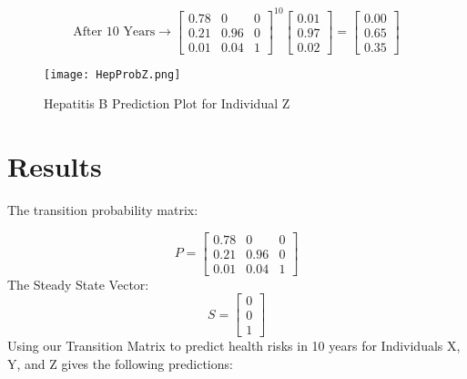 \documentclass{article}
\begin{document}
\begin{equation*}
\text{After 10 Years}
\longrightarrow
   \begin{bmatrix}
    0.78 & 0 & 0 \\
    0.21 & 0.96 & 0 \\
    0.01 & 0.04 & 1
    \end{bmatrix} ^{10}
    \begin{bmatrix}
        0.01 \\
        0.97 \\
        0.02
   \end{bmatrix}
   =
   \begin{bmatrix}
        0.00 \\
        0.65 \\
        0.35
   \end{bmatrix}
\end{equation*}

\begin{figure}[htp]
    \centering
    \texttt{[image: HepProbZ.png]}
    \caption{Hepatitis B Prediction Plot for Individual Z}
\end{figure}

\newpage
\section{Results}

The transition probability matrix:

\begin{equation*}
P = 
\begin{bmatrix}
0.78 & 0 & 0 \\
0.21 & 0.96 & 0 \\
0.01 & 0.04 & 1
\end{bmatrix}
\end{equation*}
The Steady State Vector:
\begin{equation*}
S = 
\begin{bmatrix}
0 \\
0 \\
1
\end{bmatrix}
\end{equation*}
Using our Transition Matrix to predict health risks in 10 years for Individuals X, Y, and Z gives the following predictions:
\end{document}
